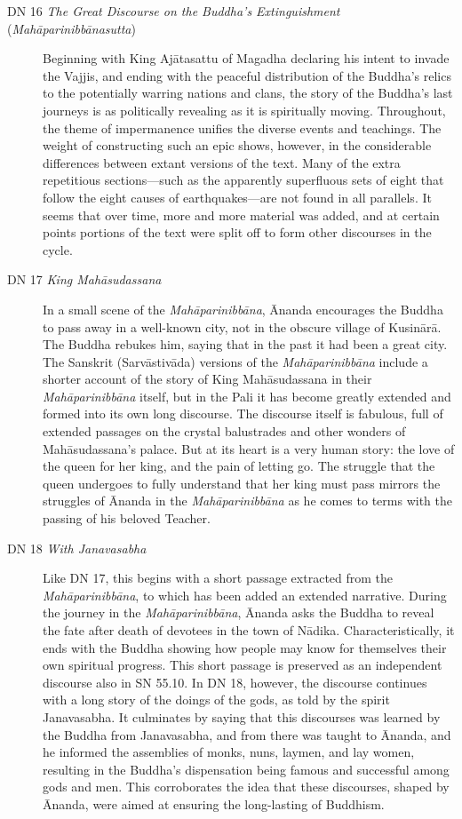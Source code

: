 \documentclass[12pt,openany]{book}%
\begin{document}
\begin{description}%
\item[DN 16 \textit{The Great Discourse on the Buddha’s Extinguishment} (\textit{\textsanskrit{Mahāparinibbānasutta}})] Beginning with King \textsanskrit{Ajātasattu} of Magadha declaring his intent to invade the Vajjis, and ending with the peaceful distribution of the Buddha’s relics to the potentially warring nations and clans, the story of the Buddha’s last journeys is as politically revealing as it is spiritually moving. Throughout, the theme of impermanence unifies the diverse events and teachings. The weight of constructing such an epic shows, however, in the considerable differences between extant versions of the text. Many of the extra repetitious sections—such as the apparently superfluous sets of eight that follow the eight causes of earthquakes—are not found in all parallels. It seems that over time, more and more material was added, and at certain points portions of the text were split off to form other discourses in the cycle.%
\item[DN 17 \textit{King \textsanskrit{Mahāsudassana}}] In a small scene of the \textit{\textsanskrit{Mahāparinibbāna}}, Ānanda encourages the Buddha to pass away in a well-known city, not in the obscure village of \textsanskrit{Kusinārā}. The Buddha rebukes him, saying that in the past it had been a great city. The Sanskrit (\textsanskrit{Sarvāstivāda}) versions of the \textit{\textsanskrit{Mahāparinibbāna}} include a shorter account of the story of King \textsanskrit{Mahāsudassana} in their \textit{\textsanskrit{Mahāparinibbāna}} itself, but in the Pali it has become greatly extended and formed into its own long discourse. The discourse itself is fabulous, full of extended passages on the crystal balustrades and other wonders of \textsanskrit{Mahāsudassana}’s palace. But at its heart is a very human story: the love of the queen for her king, and the pain of letting go. The struggle that the queen undergoes to fully understand that her king must pass mirrors the struggles of Ānanda in the \textit{\textsanskrit{Mahāparinibbāna}} as he comes to terms with the passing of his beloved Teacher.%
\item[DN 18 \textit{With Janavasabha}] Like DN 17, this begins with a short passage extracted from the \textit{\textsanskrit{Mahāparinibbāna}}, to which has been added an extended narrative. During the journey in the \textit{\textsanskrit{Mahāparinibbāna}}, Ānanda asks the Buddha to reveal the fate after death of devotees in the town of \textsanskrit{Nādika}. Characteristically, it ends with the Buddha showing how people may know for themselves their own spiritual progress. This short passage is preserved as an independent discourse also in SN 55.10. In DN 18, however, the discourse continues with a long story of the doings of the gods, as told by the spirit Janavasabha. It culminates by saying that this discourses was learned by the Buddha from Janavasabha, and from there was taught to Ānanda, and he informed the assemblies of monks, nuns, laymen, and lay women, resulting in the Buddha’s dispensation being famous and successful among gods and men. This corroborates the idea that these discourses, shaped by Ānanda, were aimed at ensuring the long-lasting of Buddhism.%

\end{description}
\end{document}

